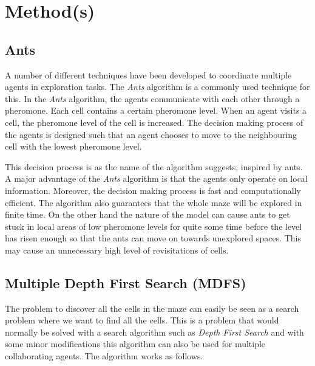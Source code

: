 \documentclass{article}
\begin{document}
\section{Method(s)}

\subsection{Ants}
A number of different techniques have been developed to coordinate multiple
agents in exploration tasks. The \textit{Ants} algorithm is a commonly used
technique for this. In the \textit{Ants} algorithm, the agents communicate with
each other through a pheromone. Each cell contains a certain
pheromone level. When an agent visits a cell, the pheromone level of the cell is
increased. The decision making process of the agents is designed such that an
agent chooses to move to the neighbouring cell with the lowest pheromone level.

This decision process is as the name of the algorithm suggests, inspired by
ants. A major advantage of the \textit{Ants} algorithm is that the
agents only operate on local information. Moreover, the decision making process is
fast and computationally efficient. The algorithm also guarantees that the whole
maze will be explored in finite time. On the other hand the nature of the model
can cause ants to get stuck in local areas of low pheromone levels for quite
some time before the level has risen enough so that the ants can move on towards
unexplored spaces. This may cause an unnecessary high level of revisitations of cells.

\subsection{Multiple Depth First Search (MDFS)}
The problem to discover all the cells in the maze can easily be seen as a search
problem where we want to find all the cells. This is a problem that would
normally be solved with a search algorithm such as \textit{Depth First Search}
and with some minor modifications this algorithm can also be used for multiple
collaborating agents. The algorithm works as follows.
\end{document}
